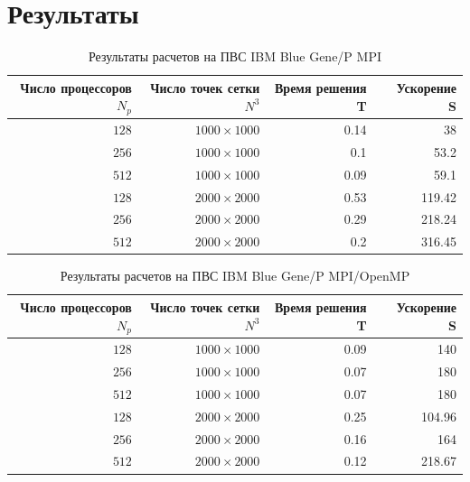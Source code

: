 \documentclass [12pt, a4paper] {article}
\let\stdsection\section
\renewcommand\section{\newpage\stdsection}
\begin{document}
\section{Результаты}

\begin{table}[htb]
    \centering
    \caption{Результаты расчетов на ПВС IBM Blue Gene/P MPI}
    \begin{tabular}{|r|r|r|r|}
        \hline
        Число процессоров $N_p$ & Число точек сетки $N^3$ & Время решения T & \
            Ускорение S \\ \hline
        $128$ & $ 1000 \times 1000 $ & 0.14 & 38 \\ 
        $256$ & $ 1000 \times 1000 $ & 0.1 & 53.2 \\ 
        $512$ & $ 1000 \times 1000 $ & 0.09 & 59.1 \\ \hline
        $128$ & $ 2000 \times 2000 $ & 0.53 & 119.42 \\ 
        $256$ & $ 2000 \times 2000 $ & 0.29 & 218.24 \\ 
        $512$ & $ 2000 \times 2000 $ & 0.2 & 316.45 \\ \hline
    \end{tabular}
\end{table}
\begin{table}[htb]
    \centering
    \caption{Результаты расчетов на ПВС IBM Blue Gene/P MPI/OpenMP}
    \begin{tabular}{r|r|r|r}
        \hline
        Число процессоров $N_p$ & Число точек сетки $N^3$ & Время решения T & \
            Ускорение S \\ \hline
        $128$ & $ 1000 \times 1000 $ & 0.09 & 140 \\ 
        $256$ & $ 1000 \times 1000 $ & 0.07 & 180 \\ 
        $512$ & $ 1000 \times 1000 $ & 0.07 & 180 \\ \hline
        $128$ & $ 2000 \times 2000 $ & 0.25 & 104.96 \\ 
        $256$ & $ 2000 \times 2000 $ & 0.16 & 164 \\ 
        $512$ & $ 2000 \times 2000 $ & 0.12 & 218.67 \\
    \end{tabular}
\end{table}
\end{document}

